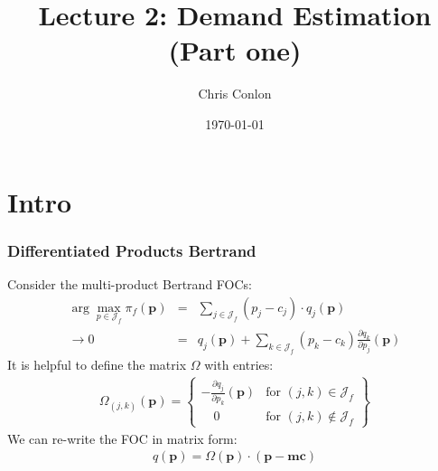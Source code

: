 \documentclass[xcolor=pdftex,dvipsnames,table,mathserif,aspectratio=169]{beamer}
\begin{document}
\title{Lecture 2: Demand Estimation (Part one)}
\author{Chris Conlon}
\date{\today}

\frame{\titlepage}

\section{Intro}

\begin{frame}
\frametitle{Differentiated Products Bertrand}
Consider the multi-product Bertrand FOCs:
\begin{eqnarray*}
\arg \max_{p \in \mathcal{J}_f} \pi_f (\mathbf{p}) &=& \sum_{j \in \mathcal{J}_f} (p_j - c_j) \cdot q_j(\mathbf{p}) \\
\rightarrow 0&=& q_j(\mathbf{p}) + \sum_{k \in \mathcal{J}_f} (p_k - c_k) \frac{\partial q_{k}}{\partial p_j}(\mathbf{p})
\end{eqnarray*}
It is helpful to define the matrix $\Omega$ with entries:
\begin{eqnarray*}
\Omega_{(j,k)}(\mathbf{p}) = \left\{\begin{array}{lr}
         - \frac{\partial q_{j}}{\partial p_k}(\mathbf{p}) & \text{for }  (j,k) \in \mathcal{J}_f\\
       	  \quad 0 & \text{for } (j,k) \notin \mathcal{J}_f
        \end{array} \right\}
\end{eqnarray*}
We can re-write the FOC in matrix form:
\begin{eqnarray*}
q(\mathbf{p}) = \Omega(\mathbf{p})\cdot(\mathbf{p}-\mathbf{mc})
\end{eqnarray*}
\end{frame}
\end{document}
